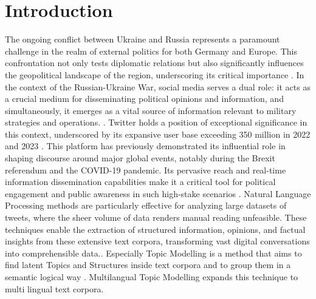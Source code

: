 \documentclass[
    11pt,
    a4paper,
    egregdoesnotlikesansseriftitles,
    toc=chapterentrywithdots,
    oneside,openright,
    titlepage,
    parskip=half,
    headings=normal,  %
    listof=totoc,
    bibliography=totoc,
    index=totoc,
    captions=tableheading,  %
    chapterprefix,
    listof=flat,
    final
]{scrbook}
\begin{document}
\setcounter{secnumdepth}{3}  %
\setcounter{tocdepth}{2}  %

\frontmatter
{} 




\tableofcontents


{\let\clearpage\relax \chapter{Introduction}}
The ongoing conflict between Ukraine and Russia represents a paramount challenge in the realm of external politics for both Germany and Europe. This confrontation not only tests diplomatic relations but also significantly influences the geopolitical landscape of the region, underscoring its critical importance \cite{Zeitenwende}. In the context of the Russian-Ukraine War, social media serves a dual role: it acts as a crucial medium for disseminating political opinions and information, and simultaneously, it emerges as a vital source of information relevant to military strategies and operations. \cite{SocialMediaUkraine}.
Twitter holds a position of exceptional significance in this context, underscored by its expansive user base exceeding 350 million in 2022 and 2023 \cite{TwitterUsers}. This platform has previously demonstrated its influential role in shaping discourse around major global events, notably during the Brexit referendum and the COVID-19  pandemic. Its pervasive reach and real-time information dissemination capabilities make it a critical tool for political engagement and public awareness in such high-stake scenarios \cite{ TwitterBrexit, TwitterBrexit2, TwitterCovid, SocialNetworking}.
Natural Language Processing methods are particularly effective for analyzing large datasets of tweets, where the sheer volume of data renders manual reading unfeasible. These techniques enable the extraction of structured information, opinions, and factual insights from these extensive text corpora, transforming vast digital conversations into comprehensible data.\cite{Fraunhofer}.
Especially Topic Modelling is a method that aims to find latent Topics and Structures inside text corpora and to group them in a semantic logical way \cite{TopicModelling}.
Multilangual Topic Modelling expands this technique to multi lingual text corpora.
\end{document}
